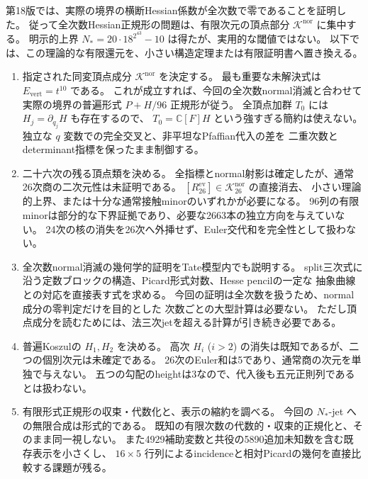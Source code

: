 \documentclass[a4paper,11pt]{ltjsarticle}
\theoremstyle{definition}
\begin{document}
第18版では、実際の境界の横断Hessian係数が全次数で零であることを証明した。
従って全次数Hessian正規形の問題は、有限次元の頂点部分
$\mathcal K^{\mathrm{nor}}$ に集中する。
明示的上界 $N_*=20\cdot18^{2^{43}}-10$ は得たが、実用的な閾値ではない。
以下では、この理論的な有限還元を、小さい構造定理または有限証明書へ置き換える。
\begin{enumerate}
 \item 指定された同変頂点成分 $\mathcal K^{\mathrm{nor}}$ を決定する。
 最も重要な未解決式は $E_{\mathrm{vert}}=t^{10}$ である。
 これが成立すれば、今回の全次数normal消滅と合わせて
 実際の境界の普遍形式 $P+H/96$ 正規形が従う。
 全頂点加群 $T_0$ には $H_j=\partial_{q_j}H$ も存在するので、
 $T_0=\mathbb C[F]H$ という強すぎる簡約は使えない。
 独立な $q$ 変数での完全交叉と、非平坦なPfaffian代入の差を
 二重次数とdeterminant指標を保ったまま制御する。

 \item 二十六次の残る頂点類を決める。
 全指標とnormal射影は確定したが、通常26次商の二次元性は未証明である。
 $[R_{26}^{\mathrm{ev}}]\in\mathcal K_{26}^{\mathrm{nor}}$ の直接消去、
 小さい理論的上界、または十分な通常接触minorのいずれかが必要になる。
 96列の有限minorは部分的な下界証拠であり、必要な2663本の独立方向を与えていない。
 24次の核の消失を26次へ外挿せず、Euler交代和を完全性として扱わない。

 \item 全次数normal消滅の幾何学的証明をTate模型内でも説明する。
 split三次式に沿う定数ブロックの構造、Picard形式対数、Hesse pencilの一定な
 抽象曲線との対応を直接表す式を求める。
 今回の証明は全次数を扱うため、normal成分の零判定だけを目的とした
 次数ごとの大型計算は必要ない。
 ただし頂点成分を読むためには、法三次jetを超える計算が引き続き必要である。

 \item 普遍Koszulの $H_1,H_2$ を決める。
 高次 $H_i$ ($i>2$) の消失は既知であるが、二つの個別次元は未確定である。
 26次のEuler和は5であり、通常商の次元を単独で与えない。
 五つの勾配のheightは3なので、代入後も五元正則列であるとは扱わない。

 \item 有限形式正規形の収束・代数化と、表示の縮約を調べる。
 今回の $N_*$-jet への無限合成は形式的である。
 既知の有限次数の代数的・収束的正規化と、そのまま同一視しない。
 また4929補助変数と共役の5890追加未知数を含む既存表示を小さくし、
 $16\times5$ 行列によるincidenceと相対Picardの幾何を直接比較する課題が残る。


\end{enumerate}
\end{document}

